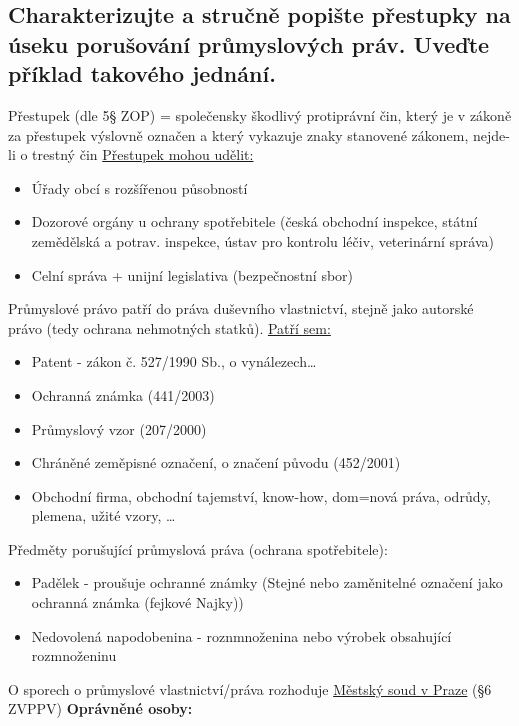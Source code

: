 \subsection{Charakterizujte a stručně popište přestupky na úseku porušování průmyslových práv. Uveďte příklad takového jednání.}
Přestupek (dle 5§ ZOP) = společensky škodlivý protiprávní čin, který je v zákoně za přestupek výslovně označen a který vykazuje znaky stanovené zákonem, nejde-li o trestný čin
\newline\newline\underline{Přestupek mohou udělit:}
\begin{itemize}
    \item Úřady obcí s rozšířenou působností
    \item Dozorové orgány u ochrany spotřebitele (česká obchodní inspekce, státní zemědělská a potrav. inspekce, ústav pro kontrolu léčiv, veterinární správa)
    \item Celní správa + unijní legislativa (bezpečnostní sbor)
\end{itemize}
Průmyslové právo patří do práva duševního vlastnictví, stejně jako autorské právo (tedy ochrana nehmotných statků).
\newline\newline\underline{Patří sem:}
\begin{itemize}
    \item Patent - zákon č. 527/1990 Sb., o vynálezech…
    \item Ochranná známka (441/2003)
    \item Průmyslový vzor (207/2000)
    \item Chráněné zeměpisné označení, o značení původu (452/2001)
    \item Obchodní firma, obchodní tajemství, know-how, dom=nová práva, odrůdy, plemena, užité vzory, …
\end{itemize}
\newline Předměty porušující průmyslová práva (ochrana spotřebitele):
\begin{itemize}
    \item Padělek - proušuje ochranné známky (Stejné nebo zaměnitelné označení jako ochranná známka (fejkové Najky))
    \item Nedovolená napodobenina - roznmnoženina nebo výrobek obsahující rozmnoženinu
\end{itemize}
O sporech o průmyslové vlastnictví/práva rozhoduje \underline{Městský soud v Praze} (§6 ZVPPV)
\newline\newline\textbf{Oprávněné osoby:}
